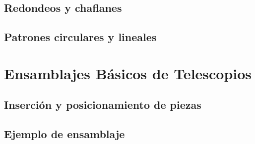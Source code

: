 \subsection{Redondeos y chaflanes}

\subsection{Patrones circulares y lineales}


\section{Ensamblajes Básicos de Telescopios}

\subsection{Inserción y posicionamiento de piezas}

\subsection{Ejemplo de ensamblaje}


